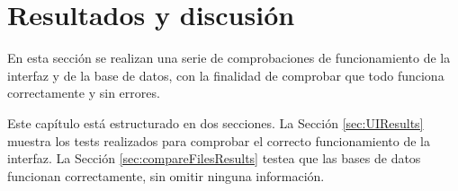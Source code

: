 \chapter{Resultados y discusión}
\label{ch:resultados}

En esta sección se realizan una serie de comprobaciones de funcionamiento de la interfaz y de la base de datos, con la finalidad de comprobar que todo funciona correctamente y sin errores.

Este capítulo está estructurado en dos secciones. La Sección \ref{sec:UIResults} muestra los tests realizados para comprobar el correcto funcionamiento de la interfaz. La Sección \ref{sec:compareFilesResults} testea que las bases de datos funcionan correctamente, sin omitir ninguna información.


